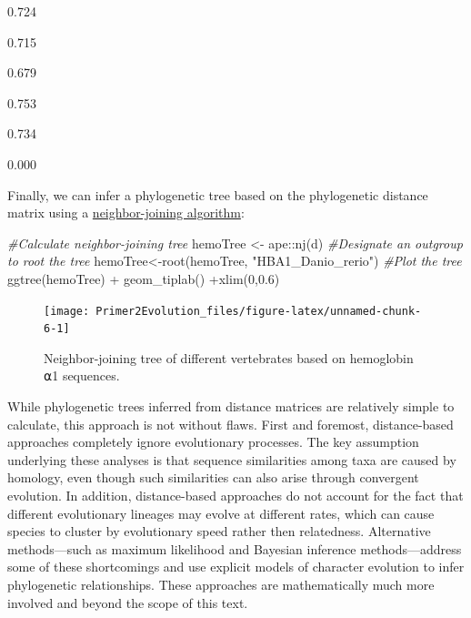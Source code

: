 \documentclass[
]{book}
\newenvironment{Shaded}{\begin{snugshade}}{\end{snugshade}}
\newcommand{\CommentTok}[1]{\textcolor[rgb]{0.56,0.35,0.01}{\textit{#1}}}
\newcommand{\DecValTok}[1]{\textcolor[rgb]{0.00,0.00,0.81}{#1}}
\newcommand{\FloatTok}[1]{\textcolor[rgb]{0.00,0.00,0.81}{#1}}
\newcommand{\FunctionTok}[1]{\textcolor[rgb]{0.00,0.00,0.00}{#1}}
\newcommand{\NormalTok}[1]{#1}
\newcommand{\OtherTok}[1]{\textcolor[rgb]{0.56,0.35,0.01}{#1}}
\newcommand{\SpecialCharTok}[1]{\textcolor[rgb]{0.00,0.00,0.00}{#1}}
\newcommand{\StringTok}[1]{\textcolor[rgb]{0.31,0.60,0.02}{#1}}
\begin{document}
0.724

0.715

0.679

0.753

0.734

0.000

Finally, we can infer a phylogenetic tree based on the phylogenetic distance matrix using a \href{https://en.wikipedia.org/wiki/Neighbor_joining}{neighbor-joining algorithm}:

\begin{Shaded}
\begin{Highlighting}[]
\CommentTok{\#Calculate neighbor{-}joining tree}
\NormalTok{hemoTree }\OtherTok{\textless{}{-}}\NormalTok{ ape}\SpecialCharTok{::}\FunctionTok{nj}\NormalTok{(d)}
\CommentTok{\#Designate an outgroup to root the tree}
\NormalTok{hemoTree}\OtherTok{\textless{}{-}}\FunctionTok{root}\NormalTok{(hemoTree, }\StringTok{"HBA1\_Danio\_rerio"}\NormalTok{)}
\CommentTok{\#Plot the tree}
\FunctionTok{ggtree}\NormalTok{(hemoTree) }\SpecialCharTok{+} \FunctionTok{geom\_tiplab}\NormalTok{() }\SpecialCharTok{+}\FunctionTok{xlim}\NormalTok{(}\DecValTok{0}\NormalTok{,}\FloatTok{0.6}\NormalTok{)}
\end{Highlighting}
\end{Shaded}

\begin{figure}
\texttt{[image: Primer2Evolution\_files/figure-latex/unnamed-chunk-6-1]} \caption{Neighbor-joining tree of different vertebrates based on hemoglobin ⍺1 sequences.}\label{fig:unnamed-chunk-6}
\end{figure}

While phylogenetic trees inferred from distance matrices are relatively simple to calculate, this approach is not without flaws. First and foremost, distance-based approaches completely ignore evolutionary processes. The key assumption underlying these analyses is that sequence similarities among taxa are caused by homology, even though such similarities can also arise through convergent evolution. In addition, distance-based approaches do not account for the fact that different evolutionary lineages may evolve at different rates, which can cause species to cluster by evolutionary speed rather then relatedness. Alternative methods---such as maximum likelihood and Bayesian inference methods---address some of these shortcomings and use explicit models of character evolution to infer phylogenetic relationships. These approaches are mathematically much more involved and beyond the scope of this text.
\end{document}
